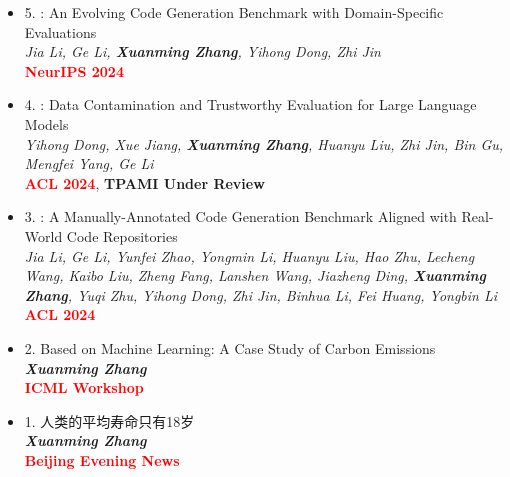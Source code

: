 \documentclass[zh]{resume}
\begin{document}
\begin{itemize}
  \item 5. : An Evolving Code Generation Benchmark with Domain-Specific Evaluations\\
  \textit{Jia Li, Ge Li, \textbf{Xuanming Zhang}, Yihong Dong, Zhi Jin}\\
  \textcolor{red}{\textbf{NeurIPS 2024}}  
  
  \item 4. : Data Contamination and Trustworthy Evaluation for Large Language Models\\
  \textit{Yihong Dong, Xue Jiang, \textbf{Xuanming Zhang}, Huanyu Liu, Zhi Jin, Bin Gu, Mengfei Yang, Ge Li}\\
  \textcolor{red}{\textbf{ACL 2024}}, \textbf{TPAMI Under Review}  

  \item 3. : A Manually-Annotated Code Generation Benchmark Aligned with Real-World Code Repositories\\
  \textit{Jia Li, Ge Li, Yunfei Zhao, Yongmin Li, Huanyu Liu, Hao Zhu, Lecheng Wang, Kaibo Liu, Zheng Fang, Lanshen Wang, Jiazheng Ding, \textbf{Xuanming Zhang}, Yuqi Zhu, Yihong Dong, Zhi Jin, Binhua Li, Fei Huang, Yongbin Li}\\
  \textcolor{red}{\textbf{ACL 2024}}  
  
  \item 2.  Based on Machine Learning: A Case Study of Carbon Emissions\\
  \textit{\textbf{Xuanming Zhang}}\\
  \textcolor{red}{\textbf{ICML Workshop}}  
  
  \item 1. 人类的平均寿命只有18岁\\
  \textit{\textbf{Xuanming Zhang}}\\
  \textcolor{red}{\textbf{Beijing Evening News}}
  \end{itemize}
  
\end{document}
